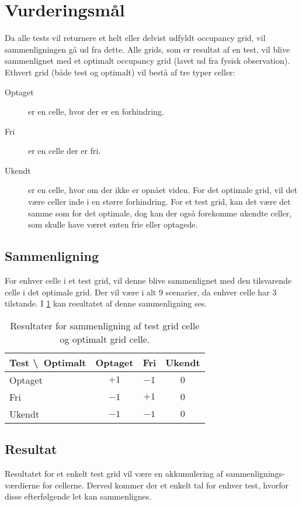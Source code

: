 \section{Vurderingsmål}
Da alle tests vil returnere et helt eller delvist udfyldt occupancy grid, vil sammenligningen gå ud fra dette.
Alle grids, som er resultat af en test, vil blive sammenlignet med et optimalt occupancy grid (lavet ud fra fysisk observation).
Ethvert grid (både test og optimalt) vil bestå af tre typer celler:
\begin{description}
\item[Optaget]{ er en celle, hvor der er en forhindring.}
\item[Fri]{ er en celle der er fri.}
\item[Ukendt]{ er en celle, hvor om der ikke er opnået viden.
For det optimale grid, vil det være celler inde i en større forhindring.
For et test grid, kan det være det samme som for det optimale, dog kan der også forekomme ukendte celler, som skulle have været enten frie eller optagede.}
\end{description}

\subsection{Sammenligning}
For enhver celle i et test grid, vil denne blive sammenlignet med den tilsvarende celle i det optimale grid.
Der vil være i alt 9 scenarier, da enhver celle har 3 tilstande.
I \cref{evaluering:sammenligning} kan resultatet af denne sammenligning ses.

\begin{table}[h]
\centering
\begin{tabular}{|l|c|c|c|}
\hline
Test \textbackslash~Optimalt & Optaget & Fri & Ukendt \\ \hline
Optaget & $+1$ & $-1$ & $0$ \\ \hline
Fri & $-1$ & $+1$ & $0$ \\ \hline
Ukendt & $-1$ & $-1$ & $0$ \\ \hline
\end{tabular}
\caption{Resultater for sammenligning af test grid celle og optimalt grid celle.}
\label{evaluering:sammenligning}
\end{table}

\subsection{Resultat}
Resultatet for et enkelt test grid vil være en akkumulering af sammenlignings-værdierne for cellerne.
Derved kommer der et enkelt tal for enhver test, hvorfor disse efterfølgende let kan sammenlignes.

